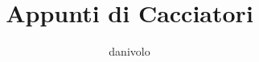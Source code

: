 \documentclass[11pt]{article} %
\title{Appunti di Cacciatori}
\author{danivolo}
\date{}
\numberwithin{equation}{subsection}
\begin{document}

\pagebreak

\pagebreak

\pagebreak

\pagebreak

\pagebreak

\pagebreak

\pagebreak
\end{document}
